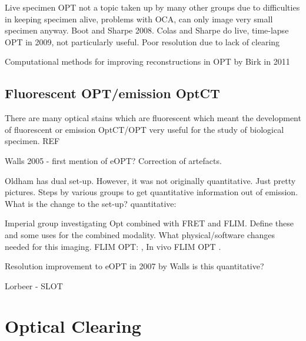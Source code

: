 \documentclass[12pt]{article}
\begin{document}
Live specimen OPT not a topic taken up by many other groups due to difficulties in keeping specimen alive, problems with OCA, can only image very small specimen anyway. \cite{Boot:2008dt} Boot and Sharpe 2008.
Colas and Sharpe do live, time-lapse OPT in 2009, not particularly useful. Poor resolution due to lack of clearing \cite{Colas:2009}  


Computational methods for improving reconstructions in OPT by Birk in 2011 \cite{Birk:2011}






\subsection{Fluorescent OPT/emission OptCT}
\label{subsec:eOPT}

There are many optical stains which are fluorescent which meant the development of fluorescent or emission OptCT/OPT very useful for the study of biological specimen. REF


Walls 2005 - first mention of eOPT? Correction of artefacts. \cite{Walls:2005ja}

Oldham has dual set-up. However, it was not originally quantitative. Just pretty pictures. Steps by various groups to get quantitative information out of emission. What is the change to the set-up? \cite{Oldham:2006dfa}
quantitative: \cite{Kim:2008eua}


Imperial group investigating Opt combined with FRET and FLIM. Define these and some uses for the combined modality. What physical/software changes needed for this imaging.
FLIM OPT: \cite{McGinty:2008ix}, In vivo FLIM OPT \cite{McGinty:2011vm}.


Resolution improvement to eOPT in 2007 by Walls \cite{Walls:2007jl} is this quantitative?


Lorbeer - SLOT \cite{Lorbeer:2011}

\newpage
\section{Optical Clearing}
\label{sec:clearing}

\end{document}
